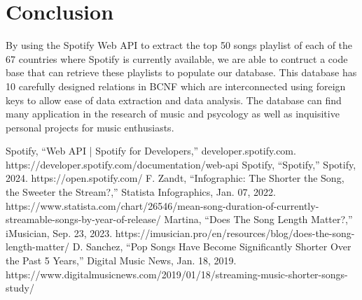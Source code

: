 \documentclass[conference]{IEEEtran}
\begin{document}
\section{Conclusion}

By using the Spotify Web API \cite{b1} to extract the top 50 songs playlist of each of the 67 countries where Spotify is currently available, we are able to contruct a code base that can retrieve these playlists to populate our database. This database has 10 carefully designed relations in BCNF which are interconnected using foreign keys to allow ease of data extraction and data analysis. The database can find many application in the research of music and psycology as well as inquisitive personal projects for music enthusiasts.  


\begin{thebibliography}{00}
Spotify, “Web API | Spotify for Developers,” developer.spotify.com. https://developer.spotify.com/documentation/web-api
Spotify, “Spotify,” Spotify, 2024. https://open.spotify.com/
F. Zandt, “Infographic: The Shorter the Song, the Sweeter the Stream?,” Statista Infographics, Jan. 07, 2022. https://www.statista.com/chart/26546/mean-song-duration-of-currently-streamable-songs-by-year-of-release/
Martina, “Does The Song Length Matter?,” iMusician, Sep. 23, 2023. https://imusician.pro/en/resources/blog/does-the-song-length-matter/
D. Sanchez, “Pop Songs Have Become Significantly Shorter Over the Past 5 Years,” Digital Music News, Jan. 18, 2019. https://www.digitalmusicnews.com/2019/01/18/streaming-music-shorter-songs-study/

\end{thebibliography}
\end{document}
